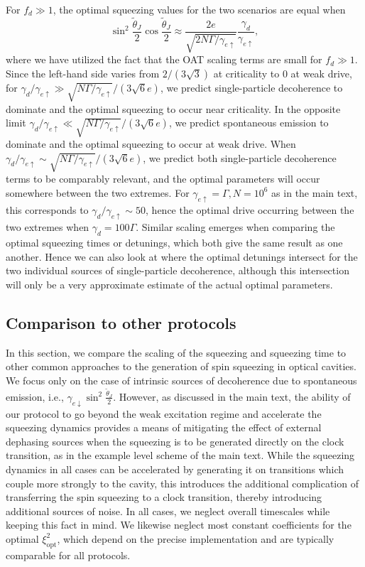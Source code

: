 \documentclass[11pt]{article}
\begin{document}
For $f_d \gg 1$, the optimal squeezing values for the two scenarios are equal when
\begin{equation}
\label{eq:optdecse}
    \sin^2 \frac{\tilde{\theta}_J}{2} \cos \frac{\tilde{\theta}_J}{2} \approx \frac{2 e }{\sqrt{2 N \Gamma/\gamma_{e \uparrow}}} \frac{\gamma_d}{\gamma_{e \uparrow}},
\end{equation}
where we have utilized the fact that the OAT scaling terms are small for $f_d \gg 1$. Since the left-hand side varies from $2/(3 \sqrt{3})$ at criticality to 0 at weak drive, for $\gamma_d/\gamma_{e \uparrow} \gg  \sqrt{ N \Gamma/\gamma_{e \uparrow}}/(3 \sqrt{6} e)$, we predict single-particle decoherence to dominate and the optimal squeezing to occur near criticality. In the opposite limit $\gamma_d/\gamma_{e \uparrow} \ll \sqrt{ N \Gamma/\gamma_{e \uparrow}}/(3 \sqrt{6} e)$, we predict spontaneous emission to dominate and the optimal squeezing to occur at weak drive. When $\gamma_d/\gamma_{e \uparrow} \sim \sqrt{ N \Gamma/\gamma_{e \uparrow}}/(3 \sqrt{6} e)$, we predict both single-particle decoherence terms to be comparably relevant, and the optimal parameters will occur somewhere between the two extremes. For $\gamma_{e \uparrow} = \Gamma, N = 10^6$ as in the main text, this corresponds to $\gamma_d/\gamma_{e \uparrow} \sim 50$, hence the optimal drive occurring between the two extremes when $\gamma_d = 100 \Gamma$. Similar scaling emerges when comparing the optimal squeezing times or detunings, which both give the same result as one another. Hence we can also look at where the optimal detunings intersect for the two individual sources of single-particle decoherence, although this intersection will only be a very approximate estimate of the actual optimal parameters. 

\subsection{Comparison to other protocols}

In this section, we compare the scaling of the squeezing and squeezing time to other common approaches to the generation of spin squeezing in optical cavities. We focus only on the case of intrinsic sources of decoherence due to spontaneous emission, i.e., $\gamma_{e \downarrow} \sin^2 \frac{\tilde{\theta}_J}{2}$. However, as discussed in the main text, the ability of our protocol to go beyond the weak excitation regime and accelerate the squeezing dynamics provides a means of mitigating the effect of external dephasing sources when the squeezing is to be generated directly on the clock transition, as in the example level scheme of the main text. While the squeezing dynamics in all cases can be accelerated by generating it on transitions which couple more strongly to the cavity, this introduces the additional complication of transferring the spin squeezing to a clock transition, thereby introducing additional sources of noise. In all cases, we neglect overall timescales while keeping this fact in mind. We likewise neglect most constant coefficients for the optimal $\xi^2_{\text{opt}}$, which depend on the precise implementation and are typically comparable for all protocols. 
\end{document}
